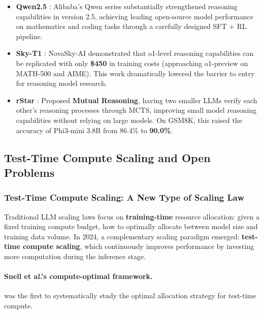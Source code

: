 \begin{itemize}[leftmargin=2em]
  \item \textbf{Qwen2.5} \cite{qwen2024qwen25}:
    Alibaba's Qwen series substantially strengthened reasoning capabilities in version 2.5,
    achieving leading open-source model performance on mathematics and coding tasks through a carefully designed SFT + RL pipeline.

  \item \textbf{Sky-T1} \cite{novasky2025skyt1}:
    NovaSky-AI demonstrated that o1-level reasoning capabilities can be replicated
    with only \textbf{\$450} in training costs
    (approaching o1-preview on MATH-500 and AIME).
    This work dramatically lowered the barrier to entry for reasoning model research.

  \item \textbf{rStar} \cite{qi2024rstar}:
    Proposed \textbf{Mutual Reasoning}, having two smaller LLMs verify each other's reasoning processes through MCTS,
    improving small model reasoning capabilities without relying on large models.
    On GSM8K, this raised the accuracy of Phi3-mini 3.8B from 86.4\% to \textbf{90.0\%}.
\end{itemize}


\subsection{Test-Time Compute Scaling and Open Problems}
\label{sec:t4-open}

\subsubsection{Test-Time Compute Scaling: A New Type of Scaling Law}
\label{sec:t4-ttc}

Traditional LLM scaling laws \cite{kaplan2020scaling,hoffmann2022chinchilla}
focus on \textbf{training-time} resource allocation:
given a fixed training compute budget, how to optimally allocate between model size and training data volume.
In 2024, a complementary scaling paradigm emerged:
\textbf{test-time compute scaling}, which continuously improves performance by investing more computation during the inference stage.

\paragraph{Snell et al.'s compute-optimal framework.}
 was the first to systematically study
the optimal allocation strategy for test-time compute.

